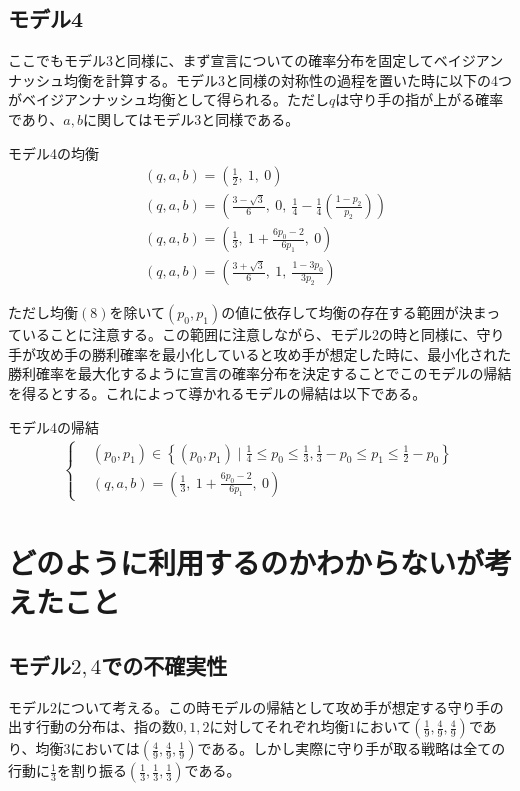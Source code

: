\documentclass{jsarticle}
\begin{document}
\subsection{モデル4}
ここでもモデル3と同様に、まず宣言についての確率分布を固定してベイジアンナッシュ均衡を計算する。モデル3と同様の対称性の過程を置いた時に以下の4つがベイジアンナッシュ均衡として得られる。ただし$q$は守り手の指が上がる確率であり、$a,b$に関してはモデル3と同様である。
\begin{itembox}[l]{モデル4の均衡}
\begin{align}
&(q, a, b) = \left(\frac{1}{2},\ 1,\ 0\right)\\[7pt]
&(q, a, b) = \left(\frac{3 - \sqrt{3}}{6},\ 0,\ \frac{1}{4} - \frac{1}{4}\left( \frac{1-p_2}{p_2} \right) \right)\\[7pt]
&(q, a, b) = \left( \frac{1}{3},\ 1 + \frac{6p_0 - 2}{6p_1},\ 0 \right)\\[7pt]
&(q, a, b) = \left( \frac{3 + \sqrt{3}}{6},\ 1,\ \frac{1 - 3p_0}{3p_2} \right)
\end{align}
\end{itembox}
ただし均衡$(8)$を除いて$(p_0, p_1)$の値に依存して均衡の存在する範囲が決まっていることに注意する。この範囲に注意しながら、モデル2の時と同様に、守り手が攻め手の勝利確率を最小化していると攻め手が想定した時に、最小化された勝利確率を最大化するように宣言の確率分布を決定することでこのモデルの帰結を得るとする。これによって導かれるモデルの帰結は以下である。
\begin{itembox}[l]{モデル4の帰結}
\begin{align}
\begin{cases}
&(p_0, p_1) \in \left\{ (p_0, p_1) \mid \frac{1}{4} \leq p_0 \leq \frac{1}{3}, \frac{1}{3} -p_0 \leq p_1 \leq \frac{1}{2} - p_0 \right\}\\[6pt]
&(q, a, b) = \left( \frac{1}{3},\ 1 + \frac{6p_0 - 2}{6p_1},\ 0 \right)
\end{cases}
\end{align}
\end{itembox}

\section{どのように利用するのかわからないが考えたこと}
\subsection{モデル$2,4$での不確実性}
モデル$2$について考える。この時モデルの帰結として攻め手が想定する守り手の出す行動の分布は、指の数$0,1,2$に対してそれぞれ均衡$1$において$(\frac{1}{9}, \frac{4}{9}, \frac{4}{9})$であり、均衡$3$においては$(\frac{4}{9}, \frac{4}{9}, \frac{1}{9})$である。しかし実際に守り手が取る戦略は全ての行動に$\frac{1}{3}$を割り振る$(\frac{1}{3}, \frac{1}{3}, \frac{1}{3})$である。
\end{document}
